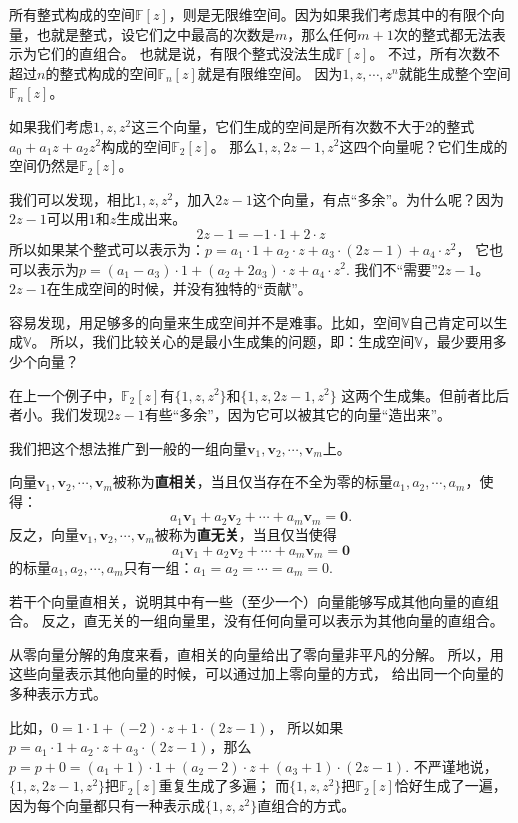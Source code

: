 \documentclass[12pt,UTF8,fontset=none]{ctexbook}
\begin{document}
所有整式构成的空间$\mathbb{F}[z]$，则是无限维空间。因为如果我们考虑其中的有限个向量，也就是整式，设它们之中最高的次数是$m$，那么任何$m+1$次的整式都无法表示为它们的直组合。
也就是说，有限个整式没法生成$\mathbb{F}[z]$。
不过，所有次数不超过$n$的整式构成的空间$\mathbb{F}_n[z]$就是有限维空间。
因为$1, z, \cdots, z^n$就能生成整个空间$\mathbb{F}_n[z]$。

如果我们考虑$1,z,z^2$这三个向量，它们生成的空间是所有次数不大于2的整式$a_0+a_1z+a_2z^2$构成的空间$\mathbb{F}_2[z]$。
那么$1,z,2z-1,z^2$这四个向量呢？它们生成的空间仍然是$\mathbb{F}_2[z]$。

我们可以发现，相比$1,z,z^2$，加入$2z-1$这个向量，有点“多余”。为什么呢？因为$2z-1$可以用$1$和$z$生成出来。
$$ 2z-1 = -1\cdot 1+2\cdot z$$
所以如果某个整式可以表示为：$ p = a_1\cdot 1+a_2\cdot z+a_3\cdot (2z-1)+a_4\cdot z^2$，
它也可以表示为$ p = (a_1-a_3)\cdot 1+(a_2+2a_3)\cdot z+a_4\cdot z^2$.
我们不“需要”$2z-1$。$2z-1$在生成空间的时候，并没有独特的“贡献”。

容易发现，用足够多的向量来生成空间并不是难事。比如，空间$\mathbb{V}$自己肯定可以生成$\mathbb{V}$。
所以，我们比较关心的是最小生成集的问题，即：生成空间$\mathbb{V}$，最少要用多少个向量？

在上一个例子中，$\mathbb{F}_2[z]$有$\{1,z,z^2\}$和$\{1,z,2z-1,z^2\}$
这两个生成集。但前者比后者小。我们发现$2z-1$有些“多余”，因为它可以被其它的向量“造出来”。

我们把这个想法推广到一般的一组向量$\mathbf{v}_1, \mathbf{v}_2 , \cdots , \mathbf{v}_m$上。
\begin{df}\label{df:2_2}
    向量$\mathbf{v}_1, \mathbf{v}_2 , \cdots , \mathbf{v}_m$被称为\textbf{直相关}，当且仅当存在不全为零的标量$a_1, a_2 , \cdots , a_m$，使得：
    $$a_1\mathbf{v}_1+a_2\mathbf{v}_2+\cdots+a_m\mathbf{v}_m = \mathbf{0}.$$
    反之，向量$\mathbf{v}_1, \mathbf{v}_2 , \cdots , \mathbf{v}_m$被称为\textbf{直无关}，当且仅当使得
    $$a_1\mathbf{v}_1+a_2\mathbf{v}_2+\cdots+a_m\mathbf{v}_m = \mathbf{0}$$
    的标量$a_1, a_2 , \cdots , a_m$只有一组：$a_1 = a_2 = \cdots = a_m = 0.$
\end{df}
若干个向量直相关，说明其中有一些（至少一个）向量能够写成其他向量的直组合。
反之，直无关的一组向量里，没有任何向量可以表示为其他向量的直组合。

从零向量分解的角度来看，直相关的向量给出了零向量非平凡的分解。
所以，用这些向量表示其他向量的时候，可以通过加上零向量的方式，
给出同一个向量的多种表示方式。

比如，$0 = 1\cdot 1+(-2)\cdot z+1\cdot(2z-1)$，
所以如果$ p = a_1\cdot 1+a_2\cdot z+a_3\cdot(2z-1)$，那么
$p = p + 0 = (a_1+1)\cdot 1+(a_2-2)\cdot z+(a_3+1)\cdot(2z-1)$. 
不严谨地说，$\{1,z,2z-1,z^2\}$把$\mathbb{F}_2[z]$重复生成了多遍；
而$\{1,z,z^2\}$把$\mathbb{F}_2[z]$恰好生成了一遍，因为每个向量都只有一种表示成$\{1,z,z^2\}$直组合的方式。
\end{document}

